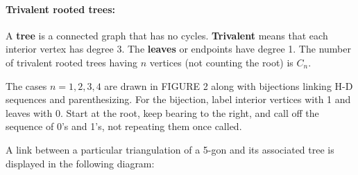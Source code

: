 \documentclass[10pt,]{book}
\newcommand{\terminology}[1]{\textbf{#1}}
\theoremstyle{plain}
\theoremstyle{definition}
\theoremstyle{definition}
\numberwithin{equation}{chapter}
\begin{document}
\paragraph[{Trivalent rooted trees:}]{Trivalent rooted trees:}\hypertarget{paragraphs-6}{}
\hypertarget{p-66}{}%
A \terminology{tree} is a connected graph that has no cycles. \terminology{Trivalent} means that each interior vertex has degree 3. The \terminology{leaves} or endpoints have degree 1. The number of trivalent rooted trees having \(n\) vertices (not counting the root) is \(C_n\).%
\par
\hypertarget{p-67}{}%
The cases \(n = 1, 2, 3, 4\) are drawn in FIGURE 2 along with bijections linking H-D sequences and parenthesizing. For the bijection, label interior vertices with 1 and leaves with 0. Start at the root, keep bearing to the right, and call off the sequence of 0's and 1's, not repeating them once called.%
\par
\hypertarget{p-68}{}%
A link between a particular triangulation of a 5-gon and its associated tree is displayed in the following diagram: %
\end{document}
